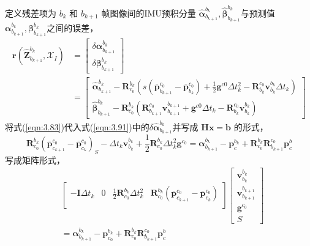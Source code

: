 定义残差项为  $b_{k} $ 和 $b_{k+1} $ 帧图像间的IMU预积分量 $\hat{\bm{\alpha}}_{b_{k+1}}^{b_k},\hat{\bm{\beta}}_{b_{k+1}}^{b_k} $与预测值 $\bm{\alpha}_{b_{k+1}}^{b_k},\bm{\beta}_{b_{k+1}}^{b_k} $之间的误差，
\begin{equation}
\label{eqn:3.91}
\begin{aligned}
\mathbf{r}\left(\hat{\mathbf{Z}}_{b_{k+1}}^{b_{k}}, \mathcal{X}_{I}\right)
&= 
\left[ \begin{array}{c}
{\delta \bm{\alpha}_{b_{k+1}}^{b_{k}}} \\ {\delta \bm{\beta}_{b_{k+1}}^{b_{k}}}
\end{array}\right]  \\ 
&=
\left[ \begin{array}{c}
\hat{\bm{\alpha}}_{b_{k+1}}^{b_{k}}  -  
	\mathbf{R}_{c_0}^{b_k}(s(\bar{\mathbf{p}}_{b_{k+1}}^{c_0}-\bar{\mathbf{p}}_{b_k}^{c_0})+\frac{1}{2}\mathbf{g}^{c0}\Delta t_k^2-\mathbf{R}_{b_k}^{c_0}\mathbf{v}_{b_k}^{b_k}\Delta t_k) \\ 
	\hat{\bm{\beta}}_{b_{k+1}}^{b_{k}}-
		\mathbf{R}_{c_0}^{b_k}(\mathbf{R}_{b_{k+1}}^{c_0}\mathbf{v}_{b_{k+1}}^{b_{k+1}}+\mathbf{g}^{c0}\Delta t_k-\mathbf{R}_{b_k}^{c_0}\mathbf{v}_{b_k}^{b_k})
		\end{array}\right]
		\end{aligned}
\end{equation}
将式(\ref{eqn:3.83})代入式(\ref{eqn:3.91})中的$\delta \hat{\bm{\alpha}}_{b_{k+1}}^{b_{k}} $并写成 $\mathbf{H} \mathbf{x}=\mathbf{b} $ 的形式，
\begin{equation}
\label{eqn:3.92}
\mathbf{ R}_{c_{0}}^{b_{k}}(\overline{\mathbf{ p}}_{c_{k+1}}^{c_{0}}-\overline{\mathbf{ p}}_{c_{k}}^{c_{0}})_{S}-\Delta t_{k} \mathbf{ v}_{b_{k}}^{b_{k}}
+\frac{1}{2} \mathbf{ R}_{c_{0}}^{b_{k}} \Delta t_{k}^{2} \mathbf{ g}^{c_{0}}
=\bm{\alpha}_{b_{k+1}}^{b_{k}}-\mathbf{ p}_{c}^{b_{k}} + \mathbf{R}_{c_0}^{b_k}\mathbf{ R}_{b_{k+1}}^{c_{0}} \mathbf{ p}_{c}^{b}
\end{equation}
写成矩阵形式，
\begin{equation}
\label{eqn:3.93}
\begin{aligned}
& \left[\begin{array}{cccc}
- \mathbf{I} \Delta t_{k} & 0 & \frac{1}{2} \mathbf{R}_{c_{0}}^{b_{k}} \Delta t_{k}^{2} & \mathbf{R}_{c_{0}}^{b_{k}}(\overline{\mathbf{p}}_{c_{k+1}}^{c_{0}}-\overline{\mathbf{p}}_{c_{k}}^{c_{0}}) \\
\end{array}\right]
\left[ \begin{array}{c}{\mathbf{v}_{b_{k}}^{b_{k}}} \\ {\mathbf{v}_{b_{k+1}}^{b_{k+1}}} \\ {\mathbf{g}^{c_{0}}} \\ {S} \end{array}\right] \\
&=
\bm{\alpha}_{b_{k+1}}^{b_{k}}-\mathbf{p}_{c_{0}}^{b_{k}} + \mathbf{R}_{c_0}^{b_k}\mathbf{R}_{b_{k+1}}^{c_{0}} \mathbf{p}_{c}^{b}
\end{aligned}
\end{equation}
